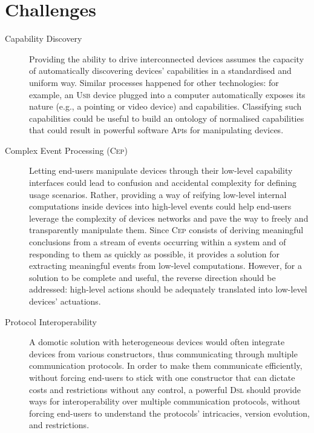\section{Challenges}
\label{sec:Challenges}

\begin{description}
	\item[Capability Discovery] Providing the ability to drive interconnected devices assumes the capacity of automatically discovering devices' capabilities in a standardised and uniform way. Similar processes happened for other technologies: for example, an \textsc{Usb} device plugged into a computer automatically exposes its nature (e.g., a pointing or video device) and capabilities. Classifying such capabilities could be useful to build an ontology of normalised capabilities that could result in powerful software \textsc{Api}s for manipulating devices. 
		
	\item[Complex Event Processing (\textsc{Cep})] Letting end-users manipulate devices through their low-level capability interfaces could lead to confusion and accidental complexity for defining usage scenarios. Rather, providing a way of reifying low-level internal computations inside devices into high-level events could help end-users leverage the complexity of devices networks and pave the way to freely and transparently manipulate them. Since \textsc{Cep} consists of deriving meaningful conclusions from a stream of events occurring within a system and of responding to them as quickly as possible, it provides a solution for extracting meaningful events from low-level computations. However, for a solution to be complete and useful, the reverse direction should be addressed: high-level actions should be adequately translated into low-level devices' actuations. 
		
	\item[Protocol Interoperability] A domotic solution with heterogeneous devices would often integrate devices from various constructors, thus communicating through multiple communication protocols. In order to make them communicate efficiently, without forcing end-users to stick with one constructor that can dictate costs and restrictions without any control, a powerful \textsc{Dsl} should provide ways for interoperability over multiple communication protocols, without forcing end-users to understand the protocols' intricacies, version evolution, and restrictions.
	

\end{description}
